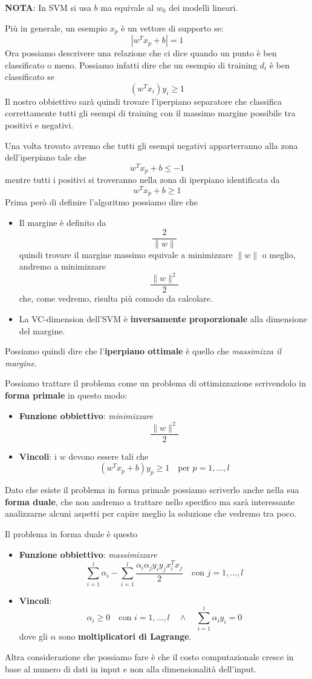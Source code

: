 \textbf{NOTA}: In SVM si usa $b$ ma equivale al $w_0$ dei modelli lineari.

Pi\`u in generale, un esempio $x_p$ \`e un vettore di supporto se:
\[ | w^T x_p + b | = 1 \]
Ora possiamo descrivere una relazione che ci dice quando un punto \`e ben classificato o meno. Possiamo infatti dire che
un esempio di training $d_i$ \`e ben classificato se
\[ (w^T x_i) y_i \geq 1 \]
Il nostro obbiettivo sar\`a quindi trovare l'iperpiano separatore che classifica correttamente tutti gli esempi di training
con il massimo margine possibile tra positivi e negativi.

Una volta trovato avremo che tutti gli esempi negativi apparterranno alla zona dell'iperpiano tale che
\[ w^T x_p + b \leq -1 \]
mentre tutti i positivi si troveranno nella zona di iperpiano identificata da
\[ w^T x_p + b \geq 1 \]
Prima per\`o di definire l'algoritmo possiamo dire che
\begin{itemize}
	\item Il margine \`e definito da
	      \[ \frac{2}{\| w \|} \]
	      quindi trovare il margine massimo equivale a minimizzare $\| w \|$ o meglio, andremo a minimizzare
	      \[\frac{\| w \|^2}{2}\]
	      che, come vedremo, risulta pi\`u comodo da calcolare.
	\item La VC-dimension dell'SVM \`e \textbf{inversamente proporzionale} alla dimensione del margine.
\end{itemize}
Possiamo quindi dire che l'\textbf{iperpiano ottimale} \`e quello che \emph{massimizza il margine}.

Possiamo trattare il problema come un problema di ottimizzazione scrivendolo in \textbf{forma primale} in questo modo:
\begin{itemize}
	\item \textbf{Funzione obbiettivo}: \emph{minimizzare}
	      \[ \frac{\| w \|^2}{2} \]
	\item \textbf{Vincoli}: i $w$ devono essere tali che
	      \[ (w^T x_p + b) y_p \geq 1 \quad \text{per } p = 1, \dots, l \]
\end{itemize}
Dato che esiste il problema in forma primale possiamo scriverlo anche nella sua \textbf{forma duale}, che non andremo a
trattare nello specifico ma sar\`a interessante analizzarne alcuni aspetti per capire meglio la soluzione che vedremo
tra poco.

Il problema in forma duale \`e questo
\begin{itemize}
	\item \textbf{Funzione obbiettivo}: \emph{massimizzare}
	      \[
		      \sum_{i=1}^l \alpha_i - \sum_{i=1}^l \frac{\alpha_i \alpha_j y_i y_j x_i^T x_j}{2}
		      \quad
		      \text{con } j = 1, \dots, l
	      \]
	\item \textbf{Vincoli}:
	      \[
		      \alpha_i \geq 0 \quad \text{con } i = 1, \dots, l
		      \quad \wedge \quad
		      \sum_{i=1}^l \alpha_i y_i = 0
	      \]
	      dove gli $\alpha$ sono \textbf{moltiplicatori di Lagrange}.
\end{itemize}
Altra considerazione che possiamo fare \`e che il costo computazionale cresce in base al numero di dati in input e non
alla dimensionalit\`a dell'input.

